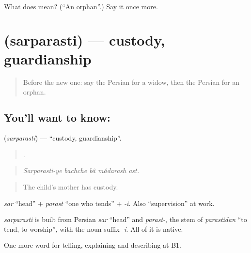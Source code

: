 \begin{tcolorbox}[breakable,colback=teal!4,colframe=teal!35!black,title={Before you move on}]
What does  mean? (\textquotedblleft{}An orphan\textquotedblright{}.) Say it once more.
\end{tcolorbox}
\section[\texorpdfstring{\fa{سرپرستی} (sarparasti)}{سرپرستی (sarparasti)}]{ (sarparasti) — custody, guardianship}

\label{lesson:FA-C336-sarparasti}



\begin{quote}
Before the new one: say the Persian for a widow, then the Persian for an orphan.
\end{quote}

\subsection*{You'll want to know: }
\textbf{} (\emph{sarparasti}) — \textquotedblleft{}custody, guardianship\textquotedblright{}.

\begin{quote}
    .
\end{quote}

\begin{quote}
\emph{Sarparasti-ye bachche bâ mâdarash ast.}
\end{quote}

\begin{quote}
The child's mother has custody.
\end{quote}

\emph{sar} \textquotedblleft{}head\textquotedblright{} + \emph{parast} \textquotedblleft{}one who tends\textquotedblright{} + \emph{-i}. Also \textquotedblleft{}supervision\textquotedblright{} at work.

\begin{cousinweb}
\emph{sarparasti} is built from Persian \emph{sar} \textquotedblleft{}head\textquotedblright{} and \emph{parast-}, the stem of \emph{parastidan} \textquotedblleft{}to tend, to worship\textquotedblright{}, with the noun suffix \emph{-i}. All of it is native.
\end{cousinweb}

\begin{grammarlens}[title={What you've built}]
One more word for telling, explaining and describing at B1.
\end{grammarlens}

